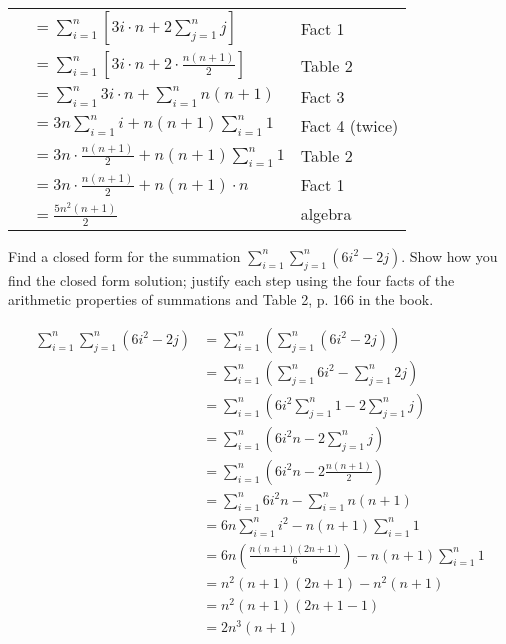 \begin{questions}
\begin{solution}
\begin{tabular}{rll}
   & $\displaystyle = \sum_{i=1}^n \left[ 3i\cdot n + 2 \sum_{j=1}^n j \right]$ & Fact 1  \\
   & $\displaystyle = \sum_{i=1}^n \left[ 3i\cdot n + 2 \cdot \frac{n(n+1)}{2} \right]$ & Table 2 \\
   & $\displaystyle = \sum_{i=1}^n 3i\cdot n + \sum_{i=1}^n n(n+1)$ & Fact 3 \\
   & $\displaystyle = 3n \sum_{i=1}^n i + n(n+1) \sum_{i=1}^n 1$ & Fact 4 (twice) \\
   & $\displaystyle = 3n \cdot \frac{n(n+1)}{2} + n(n+1) \sum_{i=1}^n 1$ & Table 2 \\
   & $\displaystyle = 3n \cdot \frac{n(n+1)}{2} + n(n+1)\cdot n$ & Fact 1 \\
   & $\displaystyle = \frac{5n^2(n+1)}{2} $ & algebra \\
\end{tabular}
\end{solution}

 Find a closed form for the summation $\displaystyle \sum_{i=1}^n \sum_{j=1}^n (6i^2 - 2j)$.  Show how you find the closed form solution; justify each step using the four facts of the arithmetic properties of summations and Table 2, p. 166 in the book.
    \ifprintanswers
        \vspace{-10pt}
   \fi
\begin{solution}
\begin{align*}
        \sum_{i=1}^n \sum_{j=1}^n (6i^2 - 2j) 
        &= \sum_{i=1}^n ( \sum_{j=1}^n (6i^2 - 2j) ) \tag{implied parentheses} \\
        &= \sum_{i=1}^n (\sum_{j=1}^n 6i^2 - \sum_{j=1}^n 2j) \tag{Fact 3} \\
        &= \sum_{i=1}^n (6i^2 \sum_{j=1}^n 1 - 2 \sum_{j=1}^n j) \tag{Fact 4, twice} \\
        &= \sum_{i=1}^n (6i^2n - 2 \sum_{j=1}^n j) \tag{Fact 1} \\
        &= \sum_{i=1}^n (6i^2n - 2 \frac{n(n+1)}{2}) \tag{Table 2} \\
        &= \sum_{i=1}^n 6i^2n - \sum_{i=1}^n  n(n+1) \tag{Fact 3} \\
        &= 6n \sum_{i=1}^n i^2 - n(n+1) \sum_{i=1}^n 1 \tag{Fact 4, twice} \\
        &= 6n (\frac{n(n+1)(2n+1)}{6}) - n(n+1) \sum_{i=1}^n 1 \tag{Table 2} \\
        &= n^2(n+1)(2n+1) - n^2(n+1) \tag{algebra} \\
        &= n^2(n+1)(2n + 1  - 1) \\
        &= 2n^3(n+1) 
    \end{align*}
\end{solution}



\end{questions}
